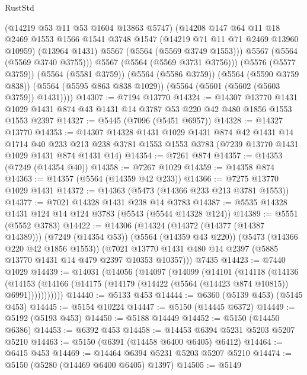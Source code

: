 \begin{lexlean}{RustStd}
\begin{coremodule}
            (@14219 @53 @11 @53 @1604 @13863 @5747)
            (@14208
              @147
              @64
              @11
              @18
              @2469
              @1553
              @1566
              @1541
              @3748
              @1547
              (@14219 @71 @11 @71 @2469 @13960 @10959)
              (@13964 @1431)
              @5567
              (@5564 (@5569 @3749 @1553)))
            @5567
            (@5564 (@5569 @3740 @3755)))
          @5567
          (@5564 (@5569 @3731 @3756)))
        (@5576 (@5577 @3759))
        (@5564 (@5581 @3759))
        (@5564 (@5586 @3759))
        (@5564 (@5590 @3759 @838))
        (@5564 (@5595 @863 @838 @1029))
        (@5564 (@5601 (@5602 (@5603 @3759)) @1431))))
@14307 := @7194 @13770
@14324 := @14307
    @13770
    @1431
    @1029
    @1431
    @874
    @43
    @1431
    @14
    @3787
    @53
    @220
    @42
    @480
    @1856
    @1553
    @1553
    @2397
@14327 := @5445 (@7096 (@5451 @6957))
@14328 := @14327 @13770
@14353 := @14307
    @14328
    @1431
    @1029
    @1431
    @874
    @42
    @1431
    @14
    @1714
    @40
    @233
    @213
    @238
    @3781
    @1553
    @1553
    @3783
    (@7239 @13770 @1431 @1029 @1431 @874 @1431 @14)
@14354 := @7261 @874
@14357 := @14353 (@7249 (@14354 @40))
@14358 := @7267 @1029
@14359 := @14358 @874
@14363 := @14357 (@5564 (@14359 @42 @233))
@14366 := @7275 @13770 @1029 @1431
@14372 := @14363 (@5473 (@14366 @233 @213 @3781 @1553))
@14377 := @7021 @14328 @1431 @238 @14 @3783
@14387 := @5535 @14328 @1431 @124 @14 @124 @3783 (@5543 (@5544 @14328 @124))
@14389 := @5551 (@5552 @3783)
@14422 := @14306
    (@14324
      (@14372 (@14377 (@14387 @14389)))
      (@7249 (@14354 @53))
      (@5564 (@14359 @43 @220))
      (@5473 (@14366 @220 @42 @1856 @1553))
      (@7021 @13770 @1431 @480 @14 @2397 (@5885 @13770 @1431 @14 @479 @2397 @10353 @10357)))
    @7435
@14423 := @7440 @1029
@14439 := @14031
    (@14056
      (@14097
        (@14099
          (@14101
            (@14118
              (@14136
                (@14153
                  (@14166 (@14175 (@14179 (@14422 (@5564 (@14423 @874 @10815)) @6991)))))))))))
@14440 := @5133 @453
@14444 := @6360 (@5139 @453) (@5145 @453)
@14445 := @5154 @10224
@14447 := @5150 (@14445 @6372)
@14449 := @5192 (@5193 @453)
@14450 := @5188 @14449
@14452 := @5150 (@14450 @6386)
@14453 := @6392 @453
@14458 := @14453 @6394 @5231 @5203 @5207 @5210
@14463 := @5150 (@6391 (@14458 @6400 @6405) @6412)
@14464 := @6415 @453
@14469 := @14464 @6394 @5231 @5203 @5207 @5210
@14474 := @5150 (@5280 (@14469 @6400 @6405) @1397)
@14505 := @5149

\end{coremodule}
\end{lexlean}
